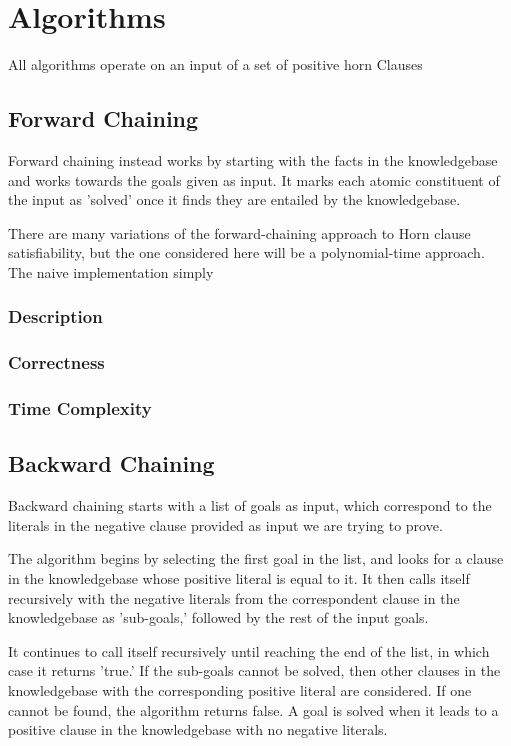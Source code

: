 \documentclass{article}
\begin{document}
\section{Algorithms}

All algorithms operate on an input of a set of positive horn Clauses

\subsection{Forward Chaining}

Forward chaining instead works by starting with the facts in the knowledgebase
and works towards the goals given as input. It marks each atomic constituent of
the input as 'solved' once it finds they are entailed by the knowledgebase.

There are many variations of the forward-chaining approach to Horn clause
satisfiability, but the one considered here will be a polynomial-time approach.
The naive implementation simply 

\subsubsection{Description}

\subsubsection{Correctness}

\subsubsection{Time Complexity}

\subsection{Backward Chaining}

Backward chaining starts with a list of goals as input, which correspond to the
literals in the negative clause provided as input we are trying to prove.

The algorithm begins by selecting the first goal in the list, and looks for a
clause in the knowledgebase whose positive literal is equal to it. It then
calls itself recursively with the negative literals from the correspondent clause
in the knowledgebase as 'sub-goals,' followed by the rest of the input goals.

It continues to call itself recursively until reaching the end of the list, in
which case it returns 'true.' If the sub-goals cannot be solved, then other
clauses in the knowledgebase with the corresponding positive literal are
considered. If one cannot be found, the algorithm returns false. A goal is
solved when it leads to a positive clause in the knowledgebase with no negative
literals.
\end{document}
